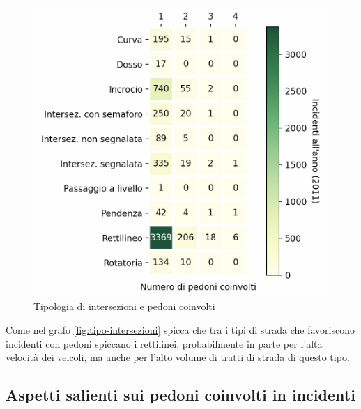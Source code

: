 \documentclass[a4paper]{report}
\begin{document}
\begin{figure}
    \includegraphics[width=\linewidth]{../src/incidenti/incidenti_senza_coords/pedoni/pedoni_incroci.png}
    \caption{Tipologia di intersezioni e pedoni coinvolti}
    \label{fig:pedoni-intersezioni}
\end{figure}

Come nel grafo \ref{fig:tipo-intersezioni} spicca che 
tra i tipi di strada che favoriscono incidenti con pedoni spiccano i rettilinei, 
probabilmente in parte per l'alta velocità dei veicoli, ma anche per l'alto volume di
tratti di strada di questo tipo.


\subsection{Aspetti salienti sui pedoni coinvolti in incidenti}
\end{document}
